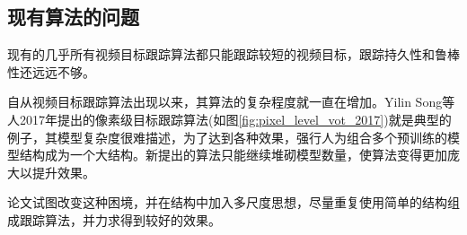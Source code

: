 \subsection{现有算法的问题} \label{section:vot_problems}
现有的几乎所有视频目标跟踪算法都只能跟踪较短的视频目标，跟踪持久性和鲁棒性还远远不够。
\par
自从视频目标跟踪算法出现以来，其算法的复杂程度就一直在增加。Yilin Song等人2017年提出的像素级目标跟踪算法(如图\ref{fig:pixel_level_vot_2017})就是典型的例子，其模型复杂度很难描述，为了达到各种效果，强行人为组合多个预训练的模型结构成为一个大结构。新提出的算法只能继续堆砌模型数量，使算法变得更加庞大以提升效果。
\par
论文试图改变这种困境，并在结构中加入多尺度思想，尽量重复使用简单的结构组成跟踪算法，并力求得到较好的效果。
